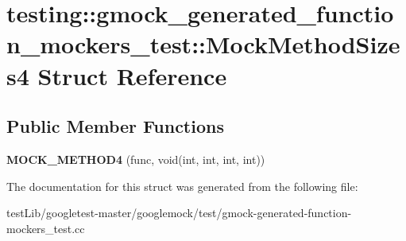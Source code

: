 \hypertarget{structtesting_1_1gmock__generated__function__mockers__test_1_1MockMethodSizes4}{}\section{testing\+:\+:gmock\+\_\+generated\+\_\+function\+\_\+mockers\+\_\+test\+:\+:Mock\+Method\+Sizes4 Struct Reference}
\label{structtesting_1_1gmock__generated__function__mockers__test_1_1MockMethodSizes4}
\subsection*{Public Member Functions}
\begin{DoxyCompactItemize}
\item 
\mbox{\label{structtesting_1_1gmock__generated__function__mockers__test_1_1MockMethodSizes4_a140f1bc5124d32b763913f5f64fe3502}} 
{\bfseries M\+O\+C\+K\+\_\+\+M\+E\+T\+H\+O\+D4} (func, void(int, int, int, int))
\end{DoxyCompactItemize}


The documentation for this struct was generated from the following file\+:\begin{DoxyCompactItemize}
\item 
test\+Lib/googletest-\/master/googlemock/test/gmock-\/generated-\/function-\/mockers\+\_\+test.\+cc\end{DoxyCompactItemize}
